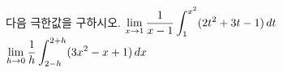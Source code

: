 다음 극한값을 구하시오.
 $\displaystyle\lim_{x\to 1}\dfrac{1}{x-1}\int_{1}^{x^2}(2t^2+3t-1)\mkern3mu dt$
 $\displaystyle\lim_{h\to 0}\dfrac{1}{h}\int_{2-h}^{2+h}(3x^2-x+1)\mkern3mu dx$
